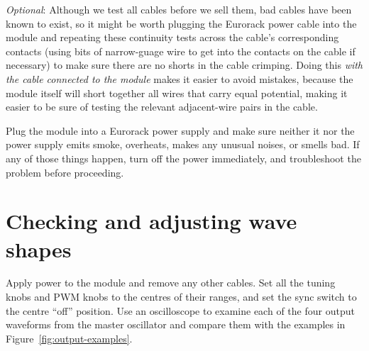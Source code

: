 \emph{Optional}:  Although we test all cables before we sell them, bad
cables have been known to exist, so it might be worth plugging the Eurorack
power cable into the module and repeating these continuity tests across the
cable's corresponding contacts (using bits of narrow-guage wire to get into
the contacts on the cable if necessary) to make sure there are no shorts in
the cable crimping.  Doing this \emph{with the cable connected to the
module} makes it easier to avoid mistakes, because the module itself will
short together all wires that carry equal potential, making it easier to be
sure of testing the relevant adjacent-wire pairs in the cable.

Plug the module into a Eurorack power supply and make sure
neither it nor the power supply emits smoke, overheats, makes any unusual
noises, or smells bad.  If any of those things happen, turn off the power
immediately, and troubleshoot the problem before proceeding.

\section{Checking and adjusting wave shapes}

Apply power to the module and remove any other cables.  Set all the tuning
knobs and PWM knobs to the centres of their ranges, and set the sync switch
to the centre ``off'' position.  Use an oscilloscope to examine each of the
four output waveforms from the master oscillator and compare them with the
examples in Figure~\ref{fig:output-examples}.

